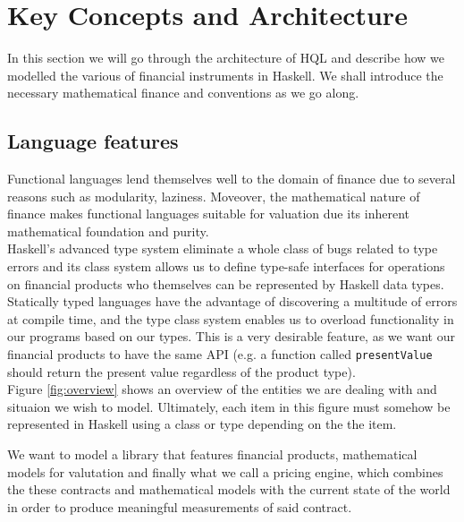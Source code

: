 \chapter{Key Concepts and Architecture}

In this section we will go through the architecture of HQL and describe how we
modelled the various of financial instruments in Haskell. We shall introduce
the necessary mathematical finance and conventions as we go along.

\section{Language features}

Functional languages lend themselves well to the domain of finance due
to several reasons such as modularity\cite{hughes:matters-cj}, 
laziness\cite{composingcontracts}. Moveover, the mathematical
 nature of finance makes functional languages suitable for valuation due its
inherent mathematical foundation and purity.\\

Haskell's advanced type system eliminate a whole class of bugs related to 
type errors and its 
class system allows us to define type-safe interfaces for operations on 
financial products who themselves can be represented by Haskell data types. 
Statically typed languages have the advantage of discovering a multitude of
errors at compile time, and the type class system enables us to overload 
functionality in our programs based on our types. This is a very desirable
feature, as we want our financial products to have the same API (e.g. a function 
called \texttt{presentValue} should return the present value regardless of the
product type).\\

Figure \ref{fig:overview} shows an overview of the entities we are dealing with
and situaion we wish to model. Ultimately, each item in this figure must somehow
be represented in Haskell using a class or type depending on the the item.

We want to model a library that features financial products, mathematical models
for valutation and finally what we call a pricing engine, which combines the 
these contracts and mathematical models with the current state of the world
in order to produce meaningful measurements of said contract.\\

